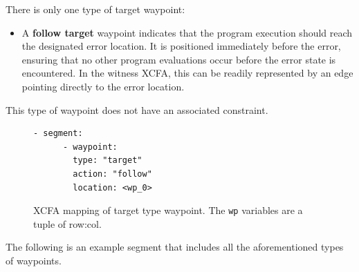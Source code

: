 There is only one type of target waypoint:
\begin{itemize}
  \item A \textbf{follow target} waypoint indicates that the program execution should reach 
    the designated error location. It is positioned immediately before the error, 
    ensuring that no other program evaluations occur before the error state is encountered. 
    In the witness XCFA, this can be readily represented by an edge pointing directly to the error location.
\end{itemize}
This type of waypoint does not have an associated constraint.

\begin{figure}[htbp]
  \centering
  \begin{minipage}[t]{0.35\textwidth}
    \begin{lstlisting}[style=c, columns=flexibl]
    - segment:
      - waypoint:
        type: "target"
        action: "follow"
        location: <wp_0>
    \end{lstlisting}
    \end{minipage}
    \hspace{2cm}
  \caption{XCFA mapping of target type waypoint. The \texttt{wp} variables are a tuple of row:col.}
  \label{fig:combined}
\end{figure}


The following is an example segment that includes all the aforementioned types of waypoints.


